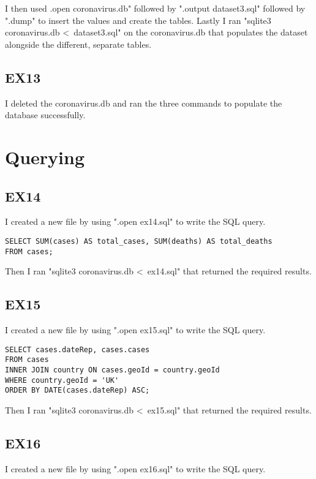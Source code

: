 \documentclass{article}
\begin{document}
I then used .open coronavirus.db" followed by ".output dataset3.sql" followed by ".dump" to insert the values and create the tables. Lastly I ran "sqlite3 coronavirus.db \textless\ dataset3.sql" on the coronavirus.db that populates the dataset alongside the different, separate tables.

\subsection{EX13}

I deleted the coronavirus.db and ran the three commands to populate the database successfully.

\section{Querying}

\subsection{EX14}

I created a new file by using ".open ex14.sql" to write the SQL query.

\begin{verbatim}
SELECT SUM(cases) AS total_cases, SUM(deaths) AS total_deaths
FROM cases;
\end{verbatim}

Then I ran "sqlite3 coronavirus.db \textless\ ex14.sql" that returned the required results.

\subsection{EX15}

I created a new file by using ".open ex15.sql" to write the SQL query.

\begin{verbatim}
SELECT cases.dateRep, cases.cases
FROM cases
INNER JOIN country ON cases.geoId = country.geoId
WHERE country.geoId = 'UK'
ORDER BY DATE(cases.dateRep) ASC;
\end{verbatim}

Then I ran "sqlite3 coronavirus.db \textless\ ex15.sql" that returned the required results.

\subsection{EX16}

I created a new file by using ".open ex16.sql" to write the SQL query.
\end{document}
